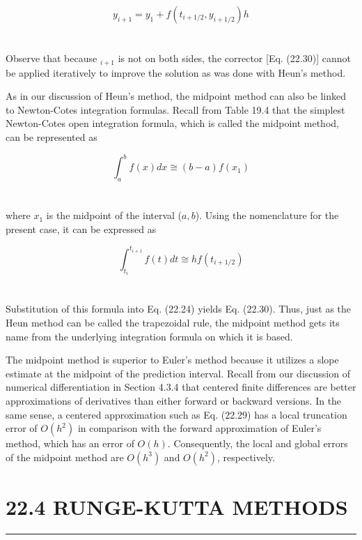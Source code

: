 \documentclass[../main.tex]{subfiles}
\begin{document}
\begin{equation}
\tag{22.30}
y_{i+1} = y_{1} + f( t_{i+1/2}, y_{i+1/2})h
\end{equation}\\
\\
Observe that because $_{i+1}$ is not on both sides, the corrector [Eq. (22.30)] cannot be applied
iteratively to improve the solution as was done with Heun's method.

As in our discussion of Heun's method, the midpoint method can also be linked to
Newton-Cotes integration formulas. Recall from Table 19.4 that the simplest Newton-Cotes
open integration formula, which is called the midpoint method, can be represented as

\begin{equation}
\tag{22.31}
\int^b_a f(x)dx \cong (b-a)f(x_{1})
\end{equation}\\
\\
where $x_{1}$ is the midpoint of the interval ($a, b$). Using the nomenclature for the present case,
it can be expressed as

\begin{equation}
\tag{22.32}
\int^{t_{i+1}}_{t_{i}} f(t)dt \cong hf(t_{i+1/2})
\end{equation}\\
\\
Substitution of this formula into Eq. (22.24) yields Eq. (22.30). Thus, just as the Heun
method can be called the trapezoidal rule, the midpoint method gets its name from the
underlying integration formula on which it is based.

The midpoint method is superior to Euler's method because it utilizes a slope estimate
at the midpoint of the prediction interval. Recall from our discussion of numerical differentiation in Section 4.3.4 that centered finite differences are better approximations of derivatives than either forward or backward versions. In the same sense, a centered approximation
such as Eq. (22.29) has a local truncation error of $O(h^2)$ in comparison with the forward
approximation of Euler's method, which has an error of $O(h)$. Consequently, the local and
global errors of the midpoint method are $O(h^3)$ and $O(h^2)$,  respectively.

\vspace{0,3in}
\section{22.4 RUNGE-KUTTA METHODS}
\vspace{0,1in}
\hrule
\vspace{0,1in}
\end{document}
